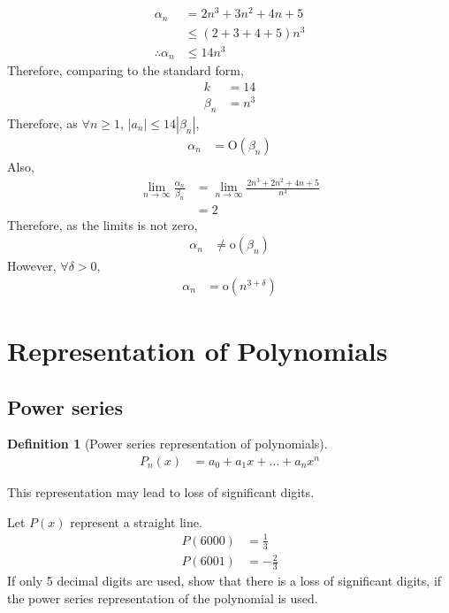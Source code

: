 \documentclass[fleqn, a4paper, 12pt, twoside, titlepage]{article}
\theoremstyle{definition}
\newtheorem{definition}{Definition}
\theoremstyle{theorem}
\begin{document}
\begin{solution}
	\begin{align*}
		\alpha_n &= 2 n^3 + 3 n^2 + 4 n + 5\\
		&\le (2 + 3 + 4 + 5) n^3\\
		\therefore \alpha_n &\le 14 n^3
	\end{align*}
	Therefore, comparing to the standard form,
	\begin{align*}
		k &= 14\\
		\beta_n &= n^3
	\end{align*}
	Therefore, as $\forall n \ge 1$, $|a_n| \le 14 |\beta_n|$,
	\begin{align*}
		\alpha_n &= \mathrm{O}(\beta_n)
	\end{align*}
	Also,
	\begin{align*}
		\lim\limits_{n \to \infty} \frac{\alpha_n}{\beta_n} &= \lim\limits_{n \to \infty} \frac{2 n^3 + 2 n^2 + 4 n + 5}{n^3}\\
		&= 2
	\end{align*}
	Therefore, as the limits is not zero,
	\begin{align*}
		\alpha_n &\neq \mathrm{o}(\beta_n)
	\end{align*}
	However, $\forall \delta > 0$,
	\begin{align*}
		\alpha_n &= \mathrm{o}\left( n^{3 + \delta} \right)
	\end{align*}
\end{solution}

\section{Representation of Polynomials}

\subsection{Power series}	

\begin{definition}[Power series representation of polynomials]
	\begin{align*}
		P_n(x) &= a_0 + a_1 x + \dots + a_n x^n
	\end{align*}
\end{definition}

This representation may lead to loss of significant digits.

\begin{question}
	Let $P(x)$ represent a straight line.
	\begin{align*}
		P(6000) &= \frac{1}{3}\\
		P(6001) &= -\frac{2}{3}
	\end{align*}
	If only 5 decimal digits are used, show that there is a loss of significant digits, if the power series representation of the polynomial is used.
\end{question}
\end{document}
